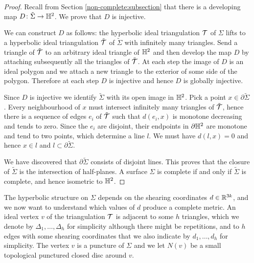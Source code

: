 \begin{proof}
Recall from Section \ref{non-complete:subsection} that there is a developing map $D\colon \tilde {\Sigma} \to \mathbb{H}^2$. We prove that $D$ is injective. 

We can construct $D$ as follows: the hyperbolic ideal triangulation $\mathcal{T}$ of $\Sigma$ lifts to a hyperbolic ideal triangulation $\tilde {\mathcal{T}}$ of $\tilde{\Sigma}$ with infinitely many triangles. Send a triangle of $\tilde {\mathcal{T}}$ to an arbitrary ideal triangle of $\mathbb{H}^2$ and then develop the map $D$ by attaching subsequently all the triangles of $\tilde {\mathcal{T}}$.  At each step the image of $D$ is an ideal polygon and we attach a new triangle to the exterior of some side of the polygon. Therefore at each step $D$ is injective and hence $D$ is globally injective.

Since $D$ is injective we identify $\tilde{\Sigma}$ with its open image in $\mathbb{H}^2$. Pick a point $x\in\partial\tilde{\Sigma}$. Every neighbourhood of $x$ must intersect infinitely many triangles of $\tilde {\mathcal{T}}$, hence there is a sequence of edges $e_i$ of $\tilde {\mathcal{T}}$ such that $d(e_i,x)$ is monotone decreasing and tends to zero. Since the $e_i$ are disjoint, their endpoints in $\partial \mathbb{H}^2$ are monotone and tend to two points, which determine a line $l$. We must have $d(l,x)=0$ and hence $x\in l$ and $l\subset \partial \tilde \Sigma$. 

We have discovered that $\partial \tilde \Sigma$ consists of disjoint lines. This proves that the closure of $\tilde\Sigma$ is the intersection of half-planes. A surface $\Sigma$ is complete if and only if $\tilde \Sigma$ is complete, and hence isometric to $\mathbb{H}^2$.
\end{proof}

The hyperbolic structure on $\Sigma$ depends on the shearing coordinates $d\in \mathbb{R}^{3k}$, and we now want to understand which values of $d$ produce a complete metric. An ideal vertex $v$ of the triangulation $\mathcal{T}$ is adjacent to some $h$ triangles, which we denote by $\Delta_{1},\ldots, \Delta_{h}$ for simplicity although there might be repetitions, and to $h$ edges with some shearing coordinates that we also indicate by $d_1,\ldots, d_h$ for simplicity. The vertex $v$ is a puncture of $\Sigma$ and we let $N(v)$ be a small topological punctured closed disc around $v$.

